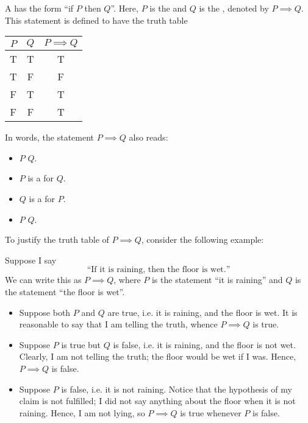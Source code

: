 \begin{definition}
    A  has the form ``if $P$ then $Q$''. Here, $P$ is the  and $Q$ is the , denoted by $P \implies Q$. This statement is defined to have the truth table
    \begin{table}[H]
        \centering
        \begin{tabular}{|c|c|c|}
        \hline
        $P$ & $Q$ & $P \implies Q$ \\ \hline\hline
        T & T & T \\ \hline
        T & F & F \\ \hline
        F & T & T \\ \hline
        F & F & T \\ \hline
        \end{tabular}
    \end{table}
    In words, the statement $P \implies Q$ also reads:
    \begin{itemize}
        \item $P$  $Q$.
        \item $P$ is a  for $Q$.
        \item $Q$ is a  for $P$.
        \item $P$  $Q$.
    \end{itemize}
\end{definition}

To justify the truth table of $P \implies Q$, consider the following example:
\begin{example}
    Suppose I say \[\text{``If it is raining, then the floor is wet.''}\] We can write this as $P \implies Q$, where $P$ is the statement ``it is raining'' and $Q$ is the statement ``the floor is wet''.

    \begin{itemize}
        \item Suppose both $P$ and $Q$ are true, i.e. it is raining, and the floor is wet. It is reasonable to say that I am telling the truth, whence $P \implies Q$ is true.
        \item Suppose $P$ is true but $Q$ is false, i.e. it is raining, and the floor is not wet. Clearly, I am not telling the truth; the floor would be wet if I was. Hence, $P \implies Q$ is false.
        \item Suppose $P$ is false, i.e. it is not raining. Notice that the hypothesis of my claim is not fulfilled; I did not say anything about the floor when it is not raining. Hence, I am not lying, so $P \implies Q$ is true whenever $P$ is false.
    \end{itemize}
\end{example}

